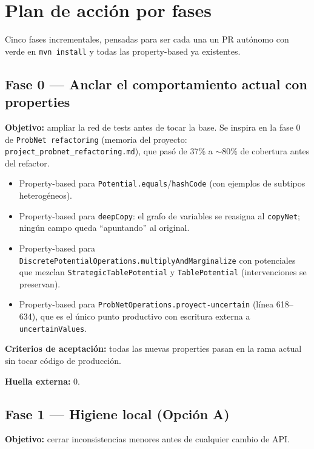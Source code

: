 \documentclass[11pt,a4paper]{article}
\newcommand{\code}[1]{\texttt{#1}}
\begin{document}
\section{Plan de acción por fases}\label{sec:plan}

Cinco fases incrementales, pensadas para ser cada una un PR autónomo con
verde en \code{mvn install} y todas las property-based ya existentes.

\subsection{Fase 0 --- Anclar el comportamiento actual con properties}

\textbf{Objetivo:} ampliar la red de tests antes de tocar la base. Se
inspira en la fase 0 de \code{ProbNet refactoring} (memoria del proyecto:
\code{project\_probnet\_refactoring.md}), que pasó de 37\% a $\sim$80\% de
cobertura antes del refactor.

\begin{itemize}[leftmargin=*]
  \item Property-based para \code{Potential.equals}/\code{hashCode} (con
        ejemplos de subtipos heterogéneos).
  \item Property-based para \code{deepCopy}: el grafo de variables se reasigna
        al \code{copyNet}; ningún campo queda ``apuntando'' al original.
  \item Property-based para \code{DiscretePotentialOperations.multiplyAndMarginalize}
        con potenciales que mezclan \code{StrategicTablePotential} y
        \code{TablePotential} (intervenciones se preservan).
  \item Property-based para
        \code{ProbNetOperations.proyect-uncertain} (línea 618--634), que es
        el único punto productivo con escritura externa a
        \code{uncertainValues}.
\end{itemize}

\textbf{Criterios de aceptación:} todas las nuevas properties pasan en la
rama actual sin tocar código de producción.

\textbf{Huella externa:} 0.

\subsection{Fase 1 --- Higiene local (Opción A)}

\textbf{Objetivo:} cerrar inconsistencias menores antes de cualquier cambio
de API.
\end{document}
